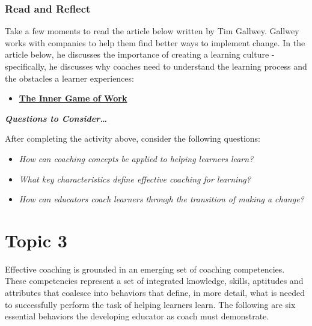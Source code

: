 \documentclass[
]{book}
\providecommand{\tightlist}{%
  \setlength{\itemsep}{0pt}\setlength{\parskip}{0pt}}
\begin{document}
\begin{reflect}
\hypertarget{read-and-reflect-2}{%
\subsubsection{Read and Reflect}\label{read-and-reflect-2}}

Take a few moments to read the article below written by Tim Gallwey. Gallwey works with companies to help them find better ways to implement change. In the article below, he discusses the importance of creating a learning culture - specifically, he discusses why coaches need to understand the learning process and the obstacles a learner experiences:

\begin{itemize}
\tightlist
\item
  \href{https://thesystemsthinker.com/the-inner-game-of-work-building-capability-in-the-workplace/}{\textbf{The Inner Game of Work}}
\end{itemize}

\textbf{\emph{Questions to Consider\ldots{}}}

After completing the activity above, consider the following questions:

\begin{itemize}
\tightlist
\item
  \emph{How can coaching concepts be applied to helping learners learn?}
\item
  \emph{What key characteristics define effective coaching for learning?}
\item
  \emph{How can educators coach learners through the transition of making a change?}
\end{itemize}
\end{reflect}

\hypertarget{topic-3}{%
\section*{Topic 3}\label{topic-3}}

Effective coaching is grounded in an emerging set of coaching competencies. These competencies represent a set of integrated knowledge, skills, aptitudes and attributes that coalesce into behaviors that define, in more detail, what is needed to successfully perform the task of helping learners learn. The following are six essential behaviors the developing educator as coach must demonstrate.
\end{document}
